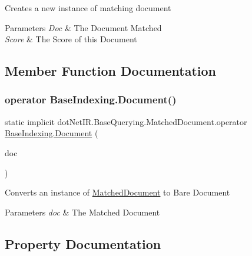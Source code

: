 Creates a new instance of matching document 


\begin{DoxyParams}{Parameters}
{\em Doc} & The Document Matched\\
\hline
{\em Score} & The Score of this Document\\
\hline
\end{DoxyParams}


\subsection{Member Function Documentation}
\hypertarget{classdot_net_i_r_1_1_base_querying_1_1_matched_document_aa6324216561bb783acbd65e1ca888a07}{}\label{classdot_net_i_r_1_1_base_querying_1_1_matched_document_aa6324216561bb783acbd65e1ca888a07} 
\subsubsection{\texorpdfstring{operator Base\+Indexing.\+Document()}{operator BaseIndexing.Document()}}
{\footnotesize\ttfamily static implicit dot\+Net\+I\+R.\+Base\+Querying.\+Matched\+Document.\+operator \hyperlink{classdot_net_i_r_1_1_base_indexing_1_1_document}{Base\+Indexing.\+Document} (\begin{DoxyParamCaption}\item[{\hyperlink{classdot_net_i_r_1_1_base_querying_1_1_matched_document}{Matched\+Document}}]{doc }\end{DoxyParamCaption})\hspace{0.3cm}{\ttfamily [static]}}



Converts an instance of \hyperlink{classdot_net_i_r_1_1_base_querying_1_1_matched_document}{Matched\+Document} to Bare Document 


\begin{DoxyParams}{Parameters}
{\em doc} & The Matched Document\\
\hline
\end{DoxyParams}


\subsection{Property Documentation}
\hypertarget{classdot_net_i_r_1_1_base_querying_1_1_matched_document_a7b3f2144f29567c77d2da128e8410c64}{}\label{classdot_net_i_r_1_1_base_querying_1_1_matched_document_a7b3f2144f29567c77d2da128e8410c64} 
